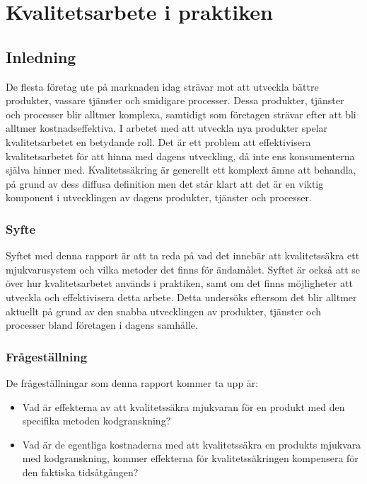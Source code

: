 \chapter{Kvalitetsarbete i praktiken}
\label{cha:indiv-report-wallstrom}

\section{Inledning}
\label{sec:introduction-wallstrom}

De flesta företag ute på marknaden idag strävar mot att utveckla bättre produkter, vassare tjänster och smidigare processer. Dessa produkter, tjänster och processer blir alltmer komplexa, samtidigt som företagen strävar efter att bli alltmer kostnadseffektiva. I arbetet med att utveckla nya produkter spelar kvalitetsarbetet en betydande roll. Det är ett problem att effektivisera kvalitetsarbetet för att hinna med dagens utveckling, då inte ens konsumenterna själva hinner med. Kvalitetssäkring är generellt ett komplext ämne att behandla, på grund av dess diffusa definition men det står klart att det är en viktig komponent i utvecklingen av dagens produkter, tjänster och processer.

\subsection{Syfte}
\label{sec:purpose-wallstrom}

Syftet med denna rapport är att ta reda på vad det innebär att kvalitetssäkra ett mjukvarusystem och vilka metoder det finns för ändamålet. Syftet är också att se över hur kvalitetsarbetet används i praktiken, samt om det finns möjligheter att utveckla och effektivisera detta arbete. Detta undersöks eftersom det blir alltmer aktuellt på grund av den snabba utvecklingen av produkter, tjänster och processer bland företagen i dagens samhälle.

\subsection{Frågeställning}
\label{sec:issue-wallstrom}

De frågeställningar som denna rapport kommer ta upp är:

\begin{itemize}
	\item Vad är effekterna av att kvalitetssäkra mjukvaran för en produkt med den specifika metoden kodgranskning?
	\item Vad är de egentliga kostnaderna med att kvalitetssäkra en produkts mjukvara med kodgranskning, kommer effekterna för kvalitetssäkringen kompensera för den faktiska tidsåtgången?
\end{itemize}

